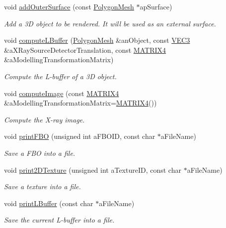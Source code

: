 \begin{DoxyCompactItemize}
void \hyperlink{classg_virtual_x_ray_1_1_x_ray_renderer_aa92db653d03526432b6531f27cd54034}{addOuterSurface} (const \hyperlink{class_graphics_1_1_polygon_mesh}{PolygonMesh} $\ast$apSurface)
\begin{DoxyCompactList}\small\item\em Add a 3D object to be rendered. It will be used as an external surface. \end{DoxyCompactList}\item 
void \hyperlink{classg_virtual_x_ray_1_1_x_ray_renderer_ab0dac046f1b64af44862b6cee9e46484}{computeLBuffer} (\hyperlink{class_graphics_1_1_polygon_mesh}{PolygonMesh} \&anObject, const \hyperlink{class_math_1_1_vec3}{VEC3} \&aXRaySourceDetectorTranslation, const \hyperlink{class_math_1_1_matrix4x4}{MATRIX4} \&aModellingTransformationMatrix)
\begin{DoxyCompactList}\small\item\em Compute the L-\/buffer of a 3D object. \end{DoxyCompactList}\item 
void \hyperlink{classg_virtual_x_ray_1_1_x_ray_renderer_a99cdb12e0b645163abfa53bafc2f74a2}{computeImage} (const \hyperlink{class_math_1_1_matrix4x4}{MATRIX4} \&aModellingTransformationMatrix=\hyperlink{class_math_1_1_matrix4x4}{MATRIX4}())
\begin{DoxyCompactList}\small\item\em Compute the X-\/ray image. \end{DoxyCompactList}\item 
void \hyperlink{classg_virtual_x_ray_1_1_x_ray_renderer_a7a8fbfaab41c0cbc382c53c91a2c2a31}{printFBO} (unsigned int aFBOID, const char $\ast$aFileName)
\begin{DoxyCompactList}\small\item\em Save a FBO into a file. \end{DoxyCompactList}\item 
void \hyperlink{classg_virtual_x_ray_1_1_x_ray_renderer_a7dd8b89283ff68084488b4a8b9022c89}{print2DTexture} (unsigned int aTextureID, const char $\ast$aFileName)
\begin{DoxyCompactList}\small\item\em Save a texture into a file. \end{DoxyCompactList}\item 
void \hyperlink{classg_virtual_x_ray_1_1_x_ray_renderer_a7d3ba3f88b17419c51b7b3c7c34dc19c}{printLBuffer} (const char $\ast$aFileName)
\begin{DoxyCompactList}\small\item\em Save the current L-\/buffer into a file. \end{DoxyCompactList}\item 

\end{DoxyCompactItemize}
